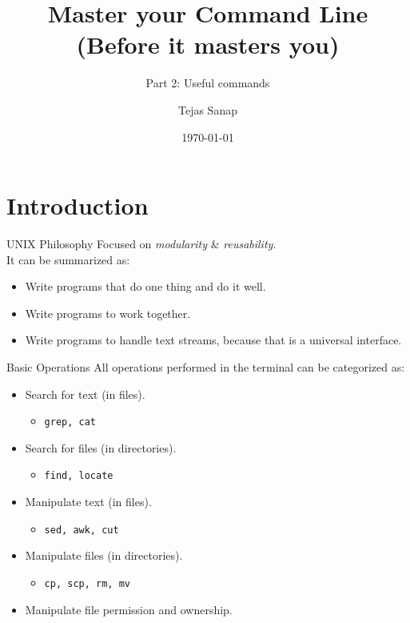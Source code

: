 \documentclass[11pt]{beamer}
\title[PLUG Meetup]{Master your Command Line \\ \small{(Before it masters you)} }
\subtitle{\large{Part 2: Useful commands}}
\author{Tejas Sanap}
\date{\today}
\begin{document}
	\begin{frame}
		\titlepage
	\end{frame}
	\begin{frame}
		\tableofcontents
	\end{frame}

	\section{Introduction}
		\begin{frame}{UNIX Philosophy}
			Focused on \emph{modularity} \& \emph{reusability}. \\
			It can be summarized as:
			\begin{itemize}
				\item Write programs that do one thing and do it well.
				\item Write programs to work together.
				\item Write programs to handle text streams, because that is a universal interface.
			\end{itemize}
		\end{frame}

		\begin{frame}{Basic Operations}
			All operations performed in the terminal can be categorized as:
			\begin{itemize}
				\item Search for text (in files).
					\begin{itemize}
						\item \texttt{grep, cat}
					\end{itemize}
				\item Search for files (in directories).
					\begin{itemize}
						\item \texttt{find, locate}
					\end{itemize}
				\item Manipulate text (in files).
					\begin{itemize}
						\item \texttt{sed, awk, cut}
					\end{itemize}
				\item Manipulate files (in directories).
					\begin{itemize}
						\item \texttt{cp, scp, rm, mv}
					\end{itemize}
				\item Manipulate file permission and ownership.
			\end{itemize}			
		\end{frame}
\end{document}
